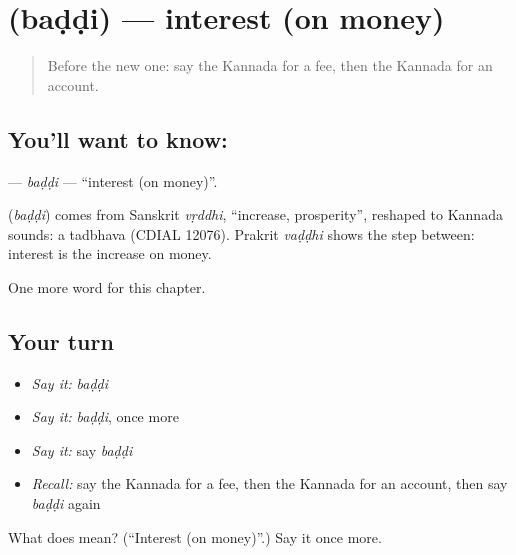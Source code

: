 \section[\texorpdfstring{\kn{ಬಡ್ಡಿ} (baḍḍi)}{ಬಡ್ಡಿ (baḍḍi)}]{ (baḍḍi) — interest (on money)}

\label{lesson:KA-C195-baddi}



\begin{quote}
Before the new one: say the Kannada for a fee, then the Kannada for an account.
\end{quote}

\subsection*{You'll want to know: }
\textbf{} — \emph{baḍḍi} — \textquotedblleft{}interest (on money)\textquotedblright{}.

\begin{cousinweb}
\textbf{} (\emph{baḍḍi}) comes from Sanskrit \emph{vṛddhi}, \textquotedblleft{}increase, prosperity\textquotedblright{}, reshaped to Kannada sounds: a tadbhava (CDIAL 12076). Prakrit \emph{vaḍḍhi} shows the step between: interest is the increase on money.
\end{cousinweb}

\begin{grammarlens}[title={What you've built}]
One more word for this chapter.
\end{grammarlens}

\subsection*{Your turn}
\begin{itemize}
\raggedright
  \item \emph{Say it:} \emph{baḍḍi}
  \item \emph{Say it:} \emph{baḍḍi}, once more
  \item \emph{Say it:} say \emph{baḍḍi}
  \item \emph{Recall:} say the Kannada for a fee, then the Kannada for an account, then say \emph{baḍḍi} again
\end{itemize}

\begin{tcolorbox}[breakable,colback=teal!4,colframe=teal!35!black,title={Before you move on}]
What does  mean? (\textquotedblleft{}Interest (on money)\textquotedblright{}.) Say it once more.
\end{tcolorbox}
